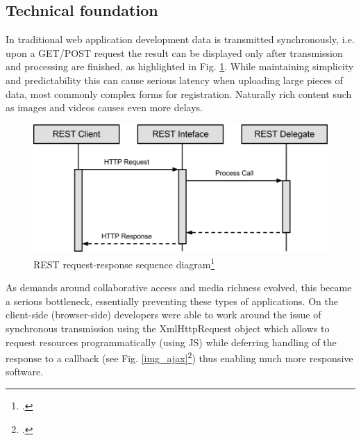 \subsection{Technical foundation}

In traditional web application development data is transmitted synchronously,
i.e. upon a GET/POST request the result can be displayed only after transmission
and processing are finished, as highlighted in Fig. \ref{img_req_res}.
While maintaining simplicity and
predictability this can cause serious latency when uploading large pieces of
data, most commonly complex forms for registration. Naturally rich content such
as images and videos causes even more delays.

\begin{figure}[hbtp]
\centering
\includegraphics[scale=0.75]{img/rest_call.png}
\caption{REST request-response sequence diagram\footcite{req_res}\label{img_req_res}}
\end{figure}

As demands around collaborative access and media richness evolved, this became a
serious bottleneck, essentially preventing these types of applications. On the
client-side (browser-side) developers were able to work around the issue of
synchronous transmission using the XmlHttpRequest object which allows to request
resources programmatically (using JS) while
deferring handling of the response to a callback (see Fig. \ref{img_ajax}\footcite{img_ajax}) thus enabling much more responsive software.

